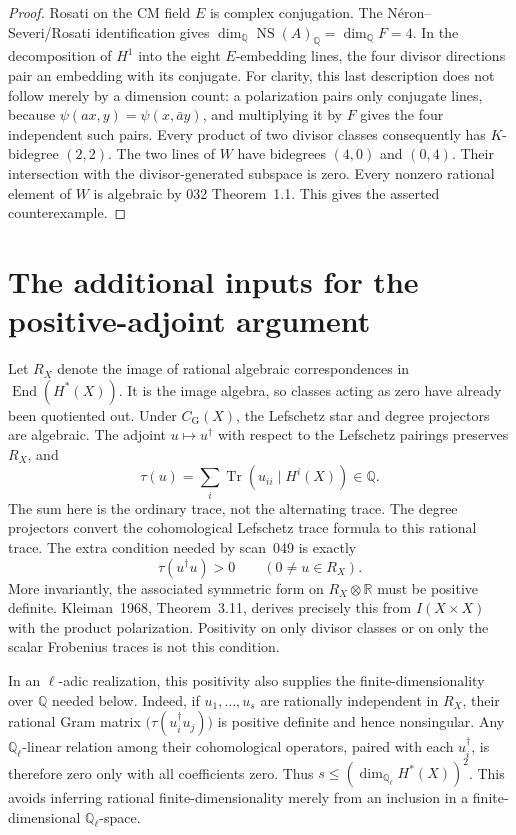 \documentclass[11pt,a4paper]{article}
\theoremstyle{definition}
\theoremstyle{remark}
\begin{document}
\begin{proof}
Rosati on the CM field $E$ is complex conjugation.  The
N\'eron--Severi/Rosati identification
\cite[Proposition~13.1]{MilneAV} gives
$\dim_{\mathbb Q}\operatorname{NS}(A)_{\mathbb Q}=\dim_{\mathbb Q}F=4$.
In the decomposition of $H^1$ into the eight $E$-embedding lines,
the four divisor directions pair an embedding with its conjugate.
For clarity, this last description does not follow merely by a dimension
count: a polarization pairs only conjugate lines, because
$\psi(ax,y)=\psi(x,\bar a y)$, and multiplying it by $F$ gives the four
independent such pairs.  Every product of two divisor classes consequently
has $K$-bidegree $(2,2)$.  The two lines of $W$ have bidegrees $(4,0)$ and
$(0,4)$.  Their intersection with the divisor-generated subspace is zero.
Every nonzero rational element of $W$ is algebraic by 032 Theorem~1.1.
This gives the asserted counterexample.
\end{proof}

\section{The additional inputs for the positive-adjoint argument}
\label{sec:positive}

Let $R_X$ denote the image of rational algebraic correspondences in
$\operatorname{End}(H^*(X))$.  It is the image algebra, so classes acting
as zero have already been quotiented out.  Under $C_{\mathrm G}(X)$,
the Lefschetz star and degree projectors are algebraic.  The adjoint
$u\mapsto u^\dagger$ with respect to the Lefschetz pairings preserves
$R_X$, and
\[
  \tau(u)=\sum_i\operatorname{Tr}(u_{ii}\mid H^i(X))\in\mathbb Q.
\]
The sum here is the ordinary trace, not the alternating trace.  The degree
projectors convert the cohomological Lefschetz trace formula to this
rational trace.  The extra condition needed by scan~049 is exactly
\begin{equation}\label{eq:positive-trace}
             \tau(u^\dagger u)>0\qquad(0\ne u\in R_X).
\end{equation}
More invariantly, the associated symmetric form on $R_X\otimes\mathbb R$
must be positive definite.  Kleiman~1968, Theorem~3.11, derives precisely
this from $I(X\times X)$ with the product polarization.  Positivity on
only divisor classes or on only the scalar Frobenius traces is not this
condition.

In an $\ell$-adic realization, this positivity also supplies the
finite-dimensionality over $\mathbb Q$ needed below. Indeed, if
$u_1,\ldots,u_s$ are rationally independent in $R_X$, their rational
Gram matrix $\bigl(\tau(u_i^\dagger u_j)\bigr)$ is positive definite
and hence nonsingular. Any $\mathbb Q_\ell$-linear relation among
their cohomological operators, paired with each $u_i^\dagger$, is
therefore zero only with all coefficients zero. Thus
$s\le(\dim_{\mathbb Q_\ell}H^*(X))^2$. This avoids inferring
rational finite-dimensionality merely from an inclusion in a
finite-dimensional $\mathbb Q_\ell$-space.
\end{document}
